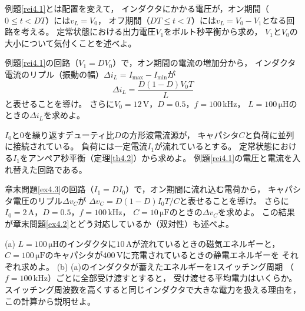 \begin{章末問題}
\item \label{ex4.1}
例題\ref{rei4.1}とは配置を変えて，
インダクタにかかる電圧が，オン期間（$0 \le t < DT$）には$v_L = V_0$，
オフ期間（$DT \le t < T$）には$v_L = V_0 - V_1$となる回路を考える。
定常状態における出力電圧$V_1$をボルト秒平衡から求め，
$V_1$と$V_0$の大小について気付くことを述べよ。

\item \label{ex4.2}
例題\ref{rei4.1}の回路（$V_1 = DV_0$）で，オン期間の電流の増加分から，
インダクタ電流のリプル（振動の幅）$\mathit{\Delta}i_L = I_{\max} - I_{\min}$が
\begin{equation*}
\mathit{\Delta}i_L = \frac{D(1-D)V_0 T}{L}
\end{equation*}
と表せることを導け。
さらに$V_0 = 12$\,V，$D = 0.5$，$f = 100$\,kHz，
$L = 100\,\mathrm{\mu H}$のときの$\mathit{\Delta}i_L$を求めよ。

\item \label{ex4.3}
$I_0$と$0$を繰り返すデューティ比$D$の方形波電流源が，
キャパシタ$C$と負荷に並列に接続されている。
負荷には一定電流$I_1$が流れているとする。
定常状態における$I_1$をアンペア秒平衡（定理\ref{th4.2}）から求めよ。
例題\ref{rei4.1}の電圧と電流を入れ替えた回路である。

\item \label{ex4.4}
章末問題\ref{ex4.3}の回路（$I_1 = DI_0$）で，オン期間に流れ込む電荷から，
キャパシタ電圧のリプル$\mathit{\Delta}v_C$が
$\mathit{\Delta}v_C = D(1-D)I_0 T/C$と表せることを導け。
さらに$I_0 = 2$\,A，$D = 0.5$，$f = 100$\,kHz，
$C = 10\,\mathrm{\mu F}$のときの$\mathit{\Delta}v_C$を求めよ。
この結果が章末問題\ref{ex4.2}とどう対応しているか（双対性）も述べよ。

\item \label{ex4.5}
(a) $L = 100\,\mathrm{\mu H}$のインダクタに$10$\,Aが流れているときの磁気エネルギーと，
$C = 100\,\mathrm{\mu F}$のキャパシタが$400$\,Vに充電されているときの静電エネルギーを
それぞれ求めよ。
(b) (a)のインダクタが蓄えたエネルギーを1スイッチング周期
（$f = 100$\,kHz）ごとに全部受け渡すとすると，
受け渡せる平均電力はいくらか。
スイッチング周波数を高くすると同じインダクタで大きな電力を扱える理由を，
この計算から説明せよ。


\end{章末問題}
